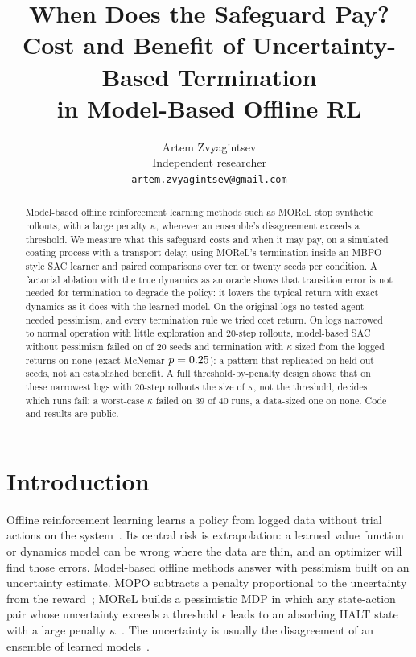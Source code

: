 \documentclass[11pt]{article}
\title{When Does the Safeguard Pay?\\Cost and Benefit of Uncertainty-Based Termination\\in Model-Based Offline RL}
\author{Artem Zvyagintsev\\[2pt]\small Independent researcher\\\small\texttt{artem.zvyagintsev@gmail.com}}
\date{}
\begin{document}
\maketitle

\begin{abstract}
Model-based offline reinforcement learning methods such as MOReL stop synthetic rollouts, with a large penalty $\kappa$, wherever an ensemble's disagreement exceeds a threshold. We measure what this safeguard costs and when it may pay, on a simulated coating process with a transport delay, using MOReL's termination inside an MBPO-style SAC learner and paired comparisons over ten or twenty seeds per condition. A factorial ablation with the true dynamics as an oracle shows that transition error is not needed for termination to degrade the policy: it lowers the typical return with exact dynamics as it does with the learned model. On the original logs no tested agent needed pessimism, and every termination rule we tried cost return. On logs narrowed to normal operation with little exploration and 20-step rollouts, model-based SAC without pessimism failed on \poolnopfails{} of 20 seeds and termination with $\kappa$ sized from the logged returns on none (exact McNemar $p=0.25$): a pattern that replicated on held-out seeds, not an established benefit. A full threshold-by-penalty design shows that on these narrowest logs with 20-step rollouts the size of $\kappa$, not the threshold, decides which runs fail: a worst-case $\kappa$ failed on 39 of 40 runs, a data-sized one on none. Code and results are public.
\end{abstract}

\section{Introduction}

Offline reinforcement learning learns a policy from logged data without trial actions on the system~\citep{levine2020offline}. Its central risk is extrapolation: a learned value function or dynamics model can be wrong where the data are thin, and an optimizer will find those errors. Model-based offline methods answer with pessimism built on an uncertainty estimate. MOPO subtracts a penalty proportional to the uncertainty from the reward~\citep{yu2020mopo}; MOReL builds a pessimistic MDP in which any state-action pair whose uncertainty exceeds a threshold $\epsilon$ leads to an absorbing HALT state with a large penalty $\kappa$~\citep{kidambi2020morel}. The uncertainty is usually the disagreement of an ensemble of learned models~\citep{lakshminarayanan2017ensembles,chua2018pets}.
\end{document}
